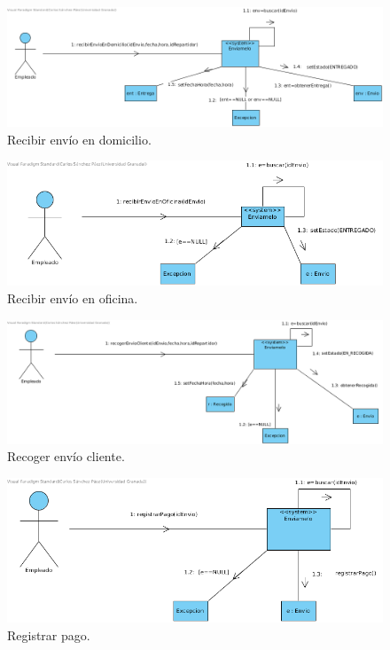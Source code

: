 \documentclass[12pt,spanish]{article}
\begin{document}
\begin{figure}[H]
\centering
\includegraphics[scale=0.5]{recibirEnvioEnDomicilio.png}
\caption{Recibir envío en domicilio.}
\end{figure}


\begin{figure}[H]
\centering
\includegraphics[scale=0.5]{recibirEnvioEnOficina.png}
\caption{Recibir envío en oficina.}
\end{figure}


\begin{figure}[H]
\centering
\includegraphics[scale=0.5]{recogerEnvioCliente.png}
\caption{Recoger envío cliente.}
\end{figure}

\begin{figure}[H]
\centering
\includegraphics[scale=0.5]{registrarPago.png}
\caption{Registrar pago.}
\end{figure}



\end{document}
